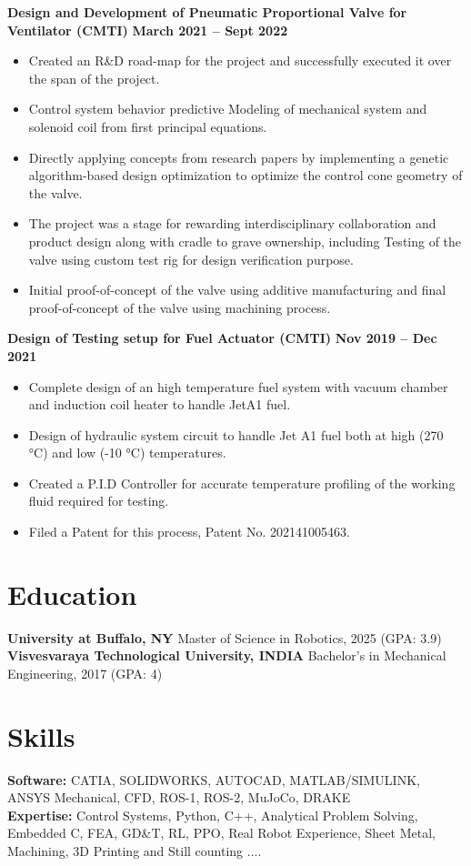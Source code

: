 \documentclass[10pt, letterpaper]{article}
\begin{document}
\textbf{Design and Development of Pneumatic Proportional Valve for Ventilator (CMTI)}  \hfill \textbf{March 2021 – Sept 2022}\\
\begin{itemize}
    \item Created an R\&D road-map for the project and successfully executed it over the span of the project.
    \item Control system behavior predictive Modeling of mechanical system and solenoid coil from first principal equations.
    \item Directly applying concepts from research papers by implementing a genetic algorithm-based design optimization to optimize the control cone geometry of the valve.
    \item The project was a stage for rewarding interdisciplinary collaboration and product design along with cradle to grave ownership, including Testing of the valve using custom test rig for design verification purpose.
    \item Initial proof-of-concept of the valve using additive manufacturing and final proof-of-concept of the valve using machining process.
\end{itemize}

\textbf{Design of Testing setup for Fuel Actuator (CMTI)}  \hfill \textbf{Nov 2019 – Dec 2021}\\
\begin{itemize}
    \item Complete design of an high temperature fuel system with vacuum chamber and induction coil heater to handle JetA1 fuel. 
    \item Design of hydraulic system circuit to handle Jet A1 fuel both at high (270 °C) and low (-10 °C) temperatures.
    \item Created a P.I.D Controller for accurate temperature profiling of the working fluid required for testing.
    \item Filed a Patent for this process, Patent No. 202141005463.
\end{itemize}

\section{Education}
\textbf{University at Buffalo, NY} \hfill Master of Science in Robotics, 2025 (GPA: 3.9)\\
\textbf{Visvesvaraya Technological University, INDIA} \hfill Bachelor’s in Mechanical Engineering, 2017 (GPA: 4)

\section{Skills}
\textbf{Software:} CATIA, SOLIDWORKS, AUTOCAD, MATLAB/SIMULINK, ANSYS Mechanical, CFD,  ROS-1, ROS-2, MuJoCo, DRAKE\\
\textbf{Expertise:} Control Systems, Python, C++, Analytical Problem Solving, Embedded C, FEA, GD\&T, RL, PPO, Real Robot Experience, Sheet Metal, Machining, 3D Printing and Still counting ....
\end{document}

